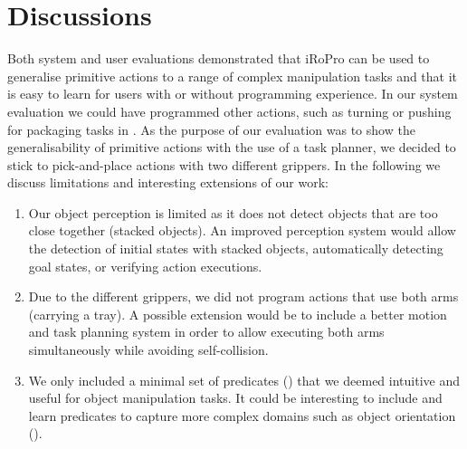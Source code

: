 \section{Discussions}
\label{sec:discussion}
Both system and user evaluations demonstrated that iRoPro can be used to generalise primitive actions to a range of complex manipulation tasks and that it is easy to learn for users with or without programming experience.
In our system evaluation we could have programmed other actions, such as turning or pushing for packaging tasks in .
As the purpose of our evaluation was to show the generalisability of primitive actions with the use of a task planner, we decided to stick to pick-and-place actions with two different grippers.
In the following we discuss limitations and interesting extensions of our work:
\begin{enumerate}
	\item Our object perception is limited as it does not detect objects that are too close together (\eg stacked objects).
	An improved perception system would allow the detection of initial states with stacked objects, automatically detecting goal states, or verifying action executions.
	\item Due to the different grippers, we did not program actions that use both arms (\eg carrying a tray). A possible extension would be to include a better motion and task planning system in order to allow executing both arms simultaneously while avoiding self-collision.
	\item We only included a minimal set of predicates () that we deemed intuitive and useful for object manipulation tasks.
	It could be interesting to include and learn predicates to capture more complex domains such as object orientation (\cite{li2016learning}).
\end{enumerate}

